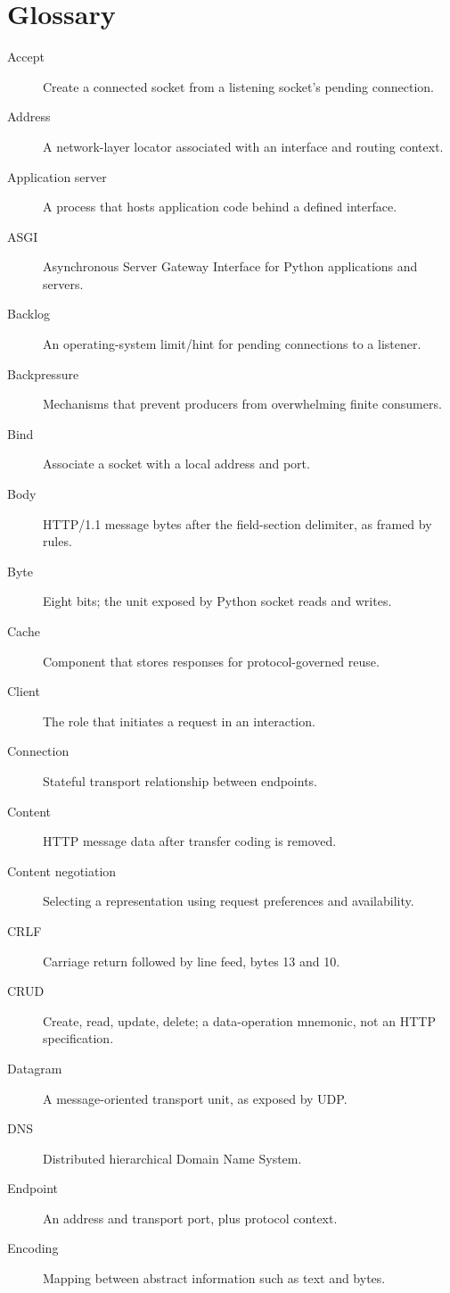 \chapter{Glossary}

\begin{description}
\item[Accept] Create a connected socket from a listening socket's pending connection.
\item[Address] A network-layer locator associated with an interface and routing context.
\item[Application server] A process that hosts application code behind a defined interface.
\item[ASGI] Asynchronous Server Gateway Interface for Python applications and servers.
\item[Backlog] An operating-system limit/hint for pending connections to a listener.
\item[Backpressure] Mechanisms that prevent producers from overwhelming finite consumers.
\item[Bind] Associate a socket with a local address and port.
\item[Body] HTTP/1.1 message bytes after the field-section delimiter, as framed by rules.
\item[Byte] Eight bits; the unit exposed by Python socket reads and writes.
\item[Cache] Component that stores responses for protocol-governed reuse.
\item[Client] The role that initiates a request in an interaction.
\item[Connection] Stateful transport relationship between endpoints.
\item[Content] HTTP message data after transfer coding is removed.
\item[Content negotiation] Selecting a representation using request preferences and availability.
\item[CRLF] Carriage return followed by line feed, bytes 13 and 10.
\item[CRUD] Create, read, update, delete; a data-operation mnemonic, not an HTTP specification.
\item[Datagram] A message-oriented transport unit, as exposed by UDP.
\item[DNS] Distributed hierarchical Domain Name System.
\item[Endpoint] An address and transport port, plus protocol context.
\item[Encoding] Mapping between abstract information such as text and bytes.

\end{description}
